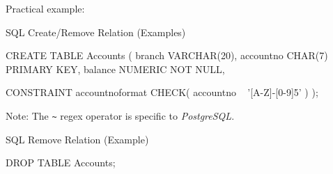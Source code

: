 \begin{multicols}{2}
\begin{CheatsheetEntryFrameNew}
        Practical example:
        \begin{center}


        \end{center}

        \SqlSubsectionAddSeparation
        \begin{SqlSubsection}{SQL Create/Remove Relation (Examples)}
            \begin{CheatsheetSubsectionLst}
                CREATE TABLE Accounts (
                    branch      VARCHAR(20),
                    accountno   CHAR(7)       PRIMARY KEY,
                    balance     NUMERIC       NOT NULL,

                    CONSTRAINT accountnoformat CHECK(
                        accountno ~ '[A-Z]-[0-9]{5}'
                    )
                );
            \end{CheatsheetSubsectionLst}

            \medskip
            {\footnotesize Note: The \texttt{\textasciitilde} regex operator is specific to \textit{PostgreSQL}.}
        \end{SqlSubsection}
        \SqlSubsectionReduceSkip
        \begin{SqlSubsection}{SQL Remove Relation (Example)}%
            \begin{CheatsheetSubsectionLst}
                DROP TABLE Accounts;
            \end{CheatsheetSubsectionLst}
        \end{SqlSubsection}


\end{CheatsheetEntryFrameNew}
\end{multicols}
